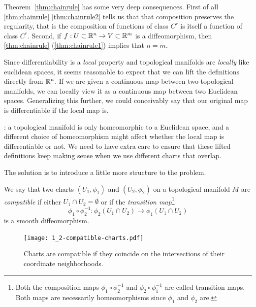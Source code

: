 \begin{remark}
Theorem~\ref{thm:chainrule} has some very deep consequences.
First of all \ref{thm:chainrule} \ref{thm:chainrule2} tells us that that composition preserves the regularity, that is the composition of functions  of class $C^r$ is itself a function of class $C^r$.
Second, if $f:U\subset\mathbb{R}^n\to V\subset\mathbb{R}^m$ is a diffeomorphism, then \ref{thm:chainrule} (\ref{thm:chainrule1}) implies that $n=m$.
\end{remark}

Since differentiability is a \emph{local} property and topological manifolds are \emph{locally} like euclidean spaces, it seems reasonable to expect that we can lift the definitions directly from $\mathbb{R}^n$.
If we are given a continuous map between two topological manifolds, we can locally view it as a continuous map between two Euclidean spaces.
Generalizing this further, we could conceivably say that our original map is differentiable if the local map is.

: a topological manifold is only homeomorphic to a Euclidean space, and a different choice of homeomorphism might affect whether the local map is differentiable or not.
We need to have extra care to ensure that these lifted definitions keep making sense when we use different charts that overlap.

The solution is to introduce a little more structure to the problem.

\begin{definition}\label{def:crcomp}
We say that two charts $(U_1, \phi_1)$ and $(U_2, \phi_2)$ on a topological manifold $M$ are \emph{compatible} if either $U_1 \cap U_2 = \emptyset$ or if the \emph{transition map}\footnote{Both the composition maps $\phi_1 \circ \phi_2^{-1}$ and $\phi_2 \circ \phi_1^{-1}$ are called transition maps. Both maps are necessarily homeomorphisms since $\phi_1$ and $\phi_2$ are.}
\begin{equation}
  \phi_1 \circ \phi_2^{-1} : \phi_2(U_1\cap U_2) \to \phi_1(U_1 \cap U_2)
\end{equation}
is a smooth diffeomorphism.
\end{definition}

\begin{figure}[htp]
  \centering
  \texttt{[image: 1\_2-compatible-charts.pdf]}
  \caption{Charts are compatible if they coincide on the intersections of their coordinate neighborhoods.}
  \label{fig:1.2-compatible-charts}
\end{figure}

